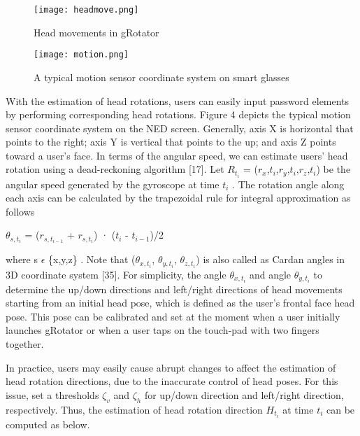 \documentclass[12pt,a4paper,oneside]{report}
\begin{document}
\begin{figure}[H]
    \begin{center}
        \label{abc}
            \texttt{[image: headmove.png]}
            \caption{Head movements in gRotator}
    \end{center}
\end{figure}
\begin{figure}[H]
    \begin{center}
        \label{abc}
            \texttt{[image: motion.png]}
            \caption{ A typical motion sensor coordinate system on smart glasses}
    \end{center}
\end{figure}
With the estimation of
head rotations, users can easily input password elements by
performing corresponding head rotations. Figure 4 depicts the
typical motion sensor coordinate system on the NED screen.
Generally, axis X is horizontal that points to the right; axis
Y is vertical that points to the up; and axis Z points toward
a user’s face. In terms of the angular speed, we can estimate
users’ head rotation using a dead-reckoning algorithm [17]. Let
$R_{t_{i}}$ = ($r_x$,$t_i$,$r_y$,$t_i$,$r_z$,$t_i$) be the angular speed generated by the
gyroscope at time $t_i$ . The rotation angle along each axis can be
calculated by the trapezoidal rule for integral approximation
as follows
\par  $\theta_{s,t_{i}}$ = ($r_{s,t_{i-1}}$ + $r_{s,t_{i}}$) · ($t_i$ - $t_{i-1}$)/2
 
where s $\epsilon$ \{x,y,z\} . Note that ($\theta_{x,t_i}$, $\theta_{y,t_i}$, $\theta_{z,t_i}$) is also called
as Cardan angles in 3D coordinate system [35]. For simplicity,
the angle $\theta_{x,t_i}$ and angle $\theta_{y,t_i}$ to determine the up/down
directions and left/right directions of head movements starting
from an initial head pose, which is defined as the user’s frontal
face head pose. This pose can be calibrated and set at the
moment when a user initially launches gRotator or when a
user taps on the touch-pad with two fingers together.
\par In practice, users may easily cause abrupt changes to affect
the estimation of head rotation directions, due to the inaccurate
control of head poses. For this issue, set a thresholds
$\zeta_v$ and $\zeta_h$ for up/down direction and left/right direction,
respectively. Thus, the estimation of head rotation direction
$H_{t_{i}}$ at time $t_i$ can be computed as below. \newline
\end{document}
